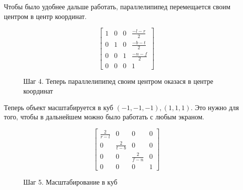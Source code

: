 \documentclass{article}
\begin{document}

Чтобы было удобнее дальше работать, параллелипипед перемещается своим центром в центр координат.

$$
\begin{bmatrix}
  1 & 0 & 0 & \frac{-l - r}{2} \\ 
  0 & 1 & 0 & \frac{-b - t}{2} \\
  0 & 0 & 1 & \frac{-n - f}{2} \\
  0 & 0 & 0 & 1\end{bmatrix}
$$


\begin{center}
\begin{figure}[H]
\caption{Шаг 4. Теперь параллелипипед своим центром оказася в центре координат}
\label{ris:image}
\end{figure}
\end{center}

Теперь объект масштабируется в куб $(-1, -1, -1), (1, 1, 1)$. Это нужно для того, чтобы в дальнейшем можно было работать с любым экраном.

$$
\begin{bmatrix}
\frac{2}{r - l} & 0 & 0 & 0 \\ 
0 & \frac{2}{t - b} & 0 & 0 \\
0 & 0 & \frac{2}{f - n} & 0 \\
0 & 0 & 0 & 1\end{bmatrix}
$$					  

\begin{center}
\begin{figure}[H]
\caption{Шаг 5. Масштабирование в куб}
\label{ris:image}
\end{figure}
\end{center}
\end{document}
